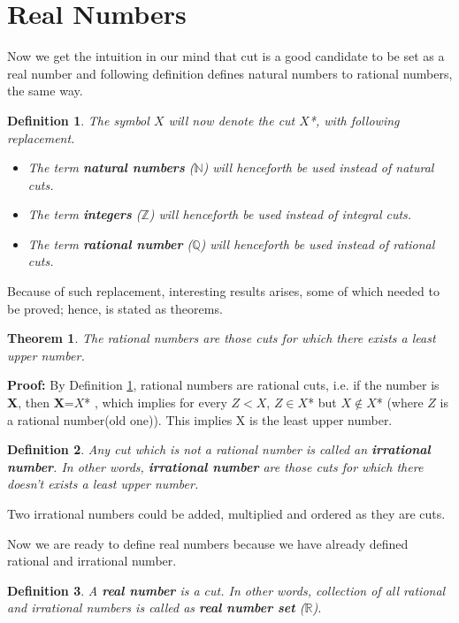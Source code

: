 \documentclass[12pt,a4paper,final,titlepage]{article}
\newtheorem{dfn}{Definition}
\newtheorem{thm}{Theorem}
\begin{document}
\bigskip

\section{Real Numbers}
Now we get the intuition in our mind that cut is a good candidate to be set as a real number and following definition defines  natural numbers to rational numbers, the same way.
\begin{dfn} \label{def8} The symbol $X$ will now denote the cut $X$*, with following replacement.
\begin{itemize}
\item The term \textbf{natural numbers} ($\mathbb{N}$) will henceforth be used instead of natural cuts.
\item The term \textbf{integers} ($\mathbb{Z}$) will henceforth be used instead of integral cuts.
\item The term \textbf{rational number} ($\mathbb{Q}$) will henceforth be used instead of rational cuts.
\end{itemize}
\end{dfn}

Because of such replacement, interesting results arises, some of which needed to be proved; hence, is stated as theorems.

\begin{thm} \label{thm13}
The rational numbers are those cuts for which there exists a least upper number.
\end{thm}
\textbf{Proof:} By Definition \ref{def8}, rational numbers are rational cuts, i.e. if the number is \textbf{X}, then \textbf{X}=$X$* , which implies for every $Z<X$, $Z\in X$* but $X \notin X$* (where $Z$ is a rational number(old one)). This implies X is the least upper number.

\medskip

\begin{dfn} \label{def9}
Any cut which is not a rational number is called an \textbf{irrational number}. In other words, \textbf{irrational number} are those cuts for which there doesn't exists a least upper number.
\end{dfn}
Two irrational numbers could be added, multiplied and ordered as they are cuts.


Now we are ready to define real numbers because we have already defined rational and irrational number.

\begin{dfn} \label{def10}
A \textbf{real number} is a cut. In other words, collection of all rational and irrational numbers is called as \textbf{real number set} ($\mathbb{R}$).
\end{dfn}
\bigskip
\end{document}
